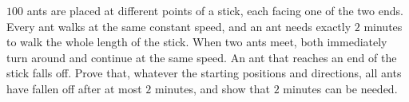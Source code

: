 $100$ ants are placed at different points of a stick, each facing one of the two ends. Every ant walks at the same constant speed, and an ant needs exactly $2$ minutes to walk the whole length of the stick. When two ants meet, both immediately turn around and continue at the same speed. An ant that reaches an end of the stick falls off. Prove that, whatever the starting positions and directions, all ants have fallen off after at most $2$ minutes, and show that $2$ minutes can be needed.
